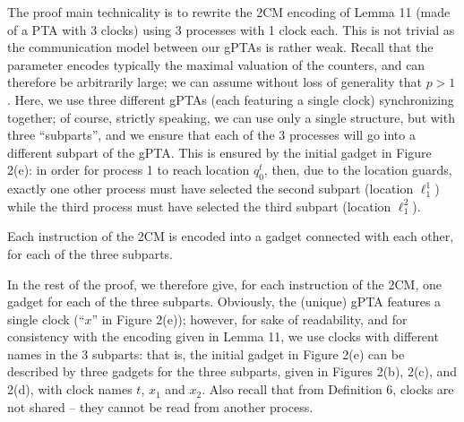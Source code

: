 \documentclass[10pt,a4paper]{article}
\begin{document}
 
The proof main technicality is to rewrite the 2CM encoding of Lemma 11 (made of a PTA with 3 clocks) using 3 processes with 1 clock each. This is not trivial as the communication model between our gPTAs is rather weak. Recall that the parameter encodes typically the maximal valuation of the counters, and can therefore be arbitrarily large; we can assume without loss of generality that $p>1$. Here, we use three different gPTAs (each featuring a single clock) synchronizing together; of course, strictly speaking, we can use only a single structure, but with three “subparts”, and we ensure that each of the 3 processes will go into a different subpart of the gPTA. This is ensured by the initial gadget in Figure 2(e): in order for process 1 to reach location $q_{0}^{t}$, then, due to the location guards, exactly one other process must have selected the second subpart (location $\mathrm{\mathrm{\ell}}_{1}^{1}$) while the third process must have selected the third subpart (location $\mathrm{\mathrm{\ell}}_{1}^{2}$).\par
 
 
 
Each instruction of the 2CM is encoded into a gadget connected with each other, for each of the three subparts.\par
 
 
 
In the rest of the proof, we therefore give, for each instruction of the 2CM, one gadget for each of the three subparts. Obviously, the (unique) gPTA features a single clock (“$x$” in Figure 2(e)); however, for sake of readability, and for consistency with the encoding given in Lemma 11, we use clocks with different names in the 3 subparts: that is, the initial gadget in Figure 2(e) can be described by three gadgets for the three subparts, given in Figures 2(b), 2(c), and 2(d), with clock names $t$, $x_{1}$ and $x_{2}$. Also recall that from Definition 6, clocks are not shared -- they cannot be read from another process.\par
 
 
 
\end{document}
